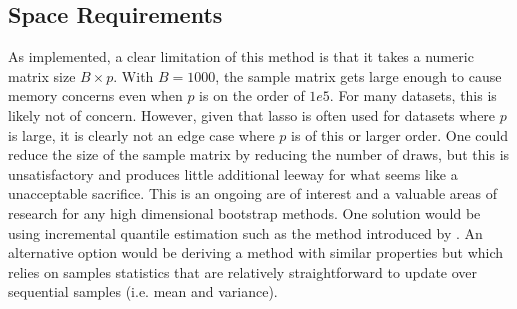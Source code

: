 \subsection{Space Requirements}

As implemented, a clear limitation of this method is that it takes a numeric matrix size $B \times p$. With $B = 1000$, the sample matrix gets large enough to cause memory concerns even when $p$ is on the order of $1e5$. For many datasets, this is likely not of concern. However, given that lasso is often used for datasets where $p$ is large, it is clearly not an edge case where $p$ is of this or larger order. One could reduce the size of the sample matrix by reducing the number of draws, but this is unsatisfactory and produces little additional leeway for what seems like a unacceptable sacrifice. This is an ongoing are of interest and a valuable areas of research for any high dimensional bootstrap methods. One solution would be using incremental quantile estimation such as the method introduced by \cite{Tierney1983}. An alternative option would be deriving a method with similar properties but which relies on samples statistics that are relatively straightforward to update over sequential samples (i.e. mean and variance).
